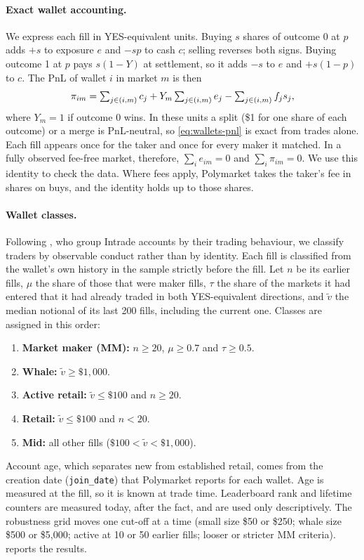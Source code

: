 \paragraph{Exact wallet accounting.}
We express each fill in YES-equivalent units. Buying $s$ shares of outcome 0 at $p$ adds $+s$ to
exposure $e$ and $-sp$ to cash $c$; selling reverses both signs. Buying outcome 1 at $p$ pays
$s(1-Y)$ at settlement, so it adds $-s$ to $e$ and $+s(1-p)$ to $c$. The PnL of wallet $i$ in market $m$
is then
\begin{equation}\label{eq:wallets-pnl}
  \pi_{im}=\textstyle\sum_{j\in(i,m)} c_j+Y_m\sum_{j\in(i,m)} e_j-\sum_{j\in(i,m)}f_j s_j ,
\end{equation}
where $Y_m=1$ if outcome 0 wins. In these units a split (\$1 for one share of each outcome) or a
merge is PnL-neutral, so \eqref{eq:wallets-pnl} is exact from trades alone. Each fill appears once
for the taker and once for every maker it matched. In a fully observed fee-free market, therefore,
$\sum_i e_{im}=0$ and $\sum_i\pi_{im}=0$. We use this identity to check the data. Where fees apply,
Polymarket takes the taker's fee in shares on buys, and the identity holds up to those shares.

\paragraph{Wallet classes.}
Following \citet{rothschildsethi2016}, who group Intrade accounts by their trading behaviour, we classify
traders by observable conduct rather than by identity. Each fill is classified from the wallet's own
history in the sample strictly before the fill.
Let $n$ be its earlier fills, $\mu$ the share of those that were maker fills, $\tau$ the share of
the markets it had entered that it had already traded in both YES-equivalent directions, and
$\tilde v$ the median notional of its last 200 fills, including the current one. Classes are
assigned in this order:
\begin{enumerate}
  \item \textbf{Market maker (MM):} $n\geq 20$, $\mu\geq 0.7$ and $\tau\geq 0.5$.
  \item \textbf{Whale:} $\tilde v\geq\$1{,}000$.
  \item \textbf{Active retail:} $\tilde v\leq\$100$ and $n\geq 20$.
  \item \textbf{Retail:} $\tilde v\leq\$100$ and $n<20$.
  \item \textbf{Mid:} all other fills ($\$100<\tilde v<\$1{,}000$).
\end{enumerate}
Account age, which separates new from established retail, comes from the creation date
(\texttt{join\_date}) that Polymarket reports for each wallet. Age is measured at the fill, so it
is known at trade time. Leaderboard rank and lifetime counters are measured today, after the fact,
and are used only descriptively. The robustness grid moves one cut-off at a time (small size \$50
or \$250; whale size \$500 or \$5{,}000; active at 10 or 50 earlier fills; looser or stricter MM
criteria).  reports the results.


